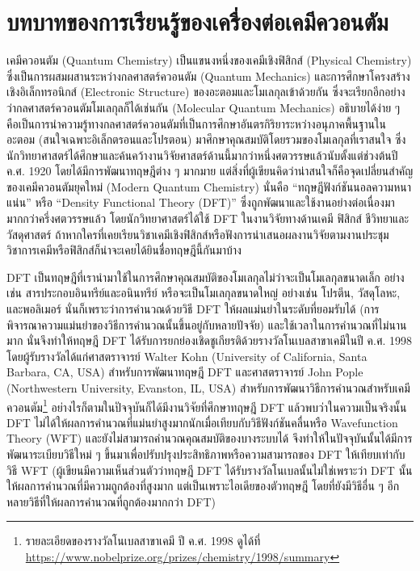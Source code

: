 \section{บทบาทของการเรียนรู้ของเครื่องต่อเคมีควอนตัม}
\label{sec:ml_in_qm}

เคมีควอนตัม (Quantum Chemistry) เป็นแขนงหนึ่งของเคมีเชิงฟิสิกส์ (Physical Chemistry) ซึ่งเป็นการผสมผสานระหว่างกลศาสตร์ควอนตัม (Quantum Mechanics) และการศึกษาโครงสร้างเชิงอิเล็กทรอนิกส์ (Electronic Structure) ของอะตอมและโมเลกุลเข้าด้วยกัน ซึ่งจะเรียกอีกอย่างว่ากลศาสตร์ควอนตัมโมเลกุลก็ได้เช่นกัน (Molecular Quantum Mechanics) อธิบายได้ง่าย ๆ คือเป็นการนำความรู้ทางกลศาสตร์ควอนตัมที่เป็นการศึกษาอันตรกิริยาระหว่างอนุภาคพื้นฐานในอะตอม (สนใจเฉพาะอิเล็กตรอนและโปรตอน) มาศึกษาคุณสมบัติโดยรวมของโมเลกุลที่เราสนใจ ซึ่งนักวิทยาศาสตร์ได้ศึกษาและค้นคว้างานวิจัยศาสตร์ด้านนี้มากว่าหนึ่งศตวรรษแล้วนับตั้งแต่ช่วงต้นปี ค.ศ. 1920 โดยได้มีการพัฒนาทฤษฎีต่าง ๆ มากมาย แต่สิ่งที่ผู้เขียนคิดว่าน่าสนใจก็คือจุดเปลี่ยนสำคัญของเคมีควอนตัมยุคใหม่ (Modern Quantum Chemistry) นั่นคือ \enquote{ทฤษฎีฟังก์ชันนอลความหนาแน่น} หรือ \enquote{Density Functional Theory (DFT)}\autocite{kohn1996} ซึ่งถูกพัฒนาและใช้งานอย่างต่อเนื่องมามากกว่าครึ่งศตวรรษแล้ว โดยนักวิทยาศาสตร์ได้ใช้ DFT ในงานวิจัยทางด้านเคมี ฟิสิกส์ ชีวิทยาและวัสดุศาสตร์ ถ้าหากใครที่เคยเรียนวิชาเคมีเชิงฟิสิกส์หรือฟังการนำเสนอผลงานวิจัยตามงานประชุมวิชาการเคมีหรือฟิสิกส์ก็น่าจะเคยได้ยินชื่อทฤษฎีนี้กันมาบ้าง 

DFT เป็นทฤษฎีที่เรานำมาใช้ในการศึกษาคุณสมบัติของโมเลกุลไม่ว่าจะเป็นโมเลกุลขนาดเล็ก อย่างเช่น สารประกอบอินทรีย์และอนินทรีย์ หรือจะเป็นโมเลกุลขนาดใหญ่ อย่างเช่น โปรตีน, วัสดุโลหะ, และพอลิเมอร์ นั่นก็เพราะว่าการคำนวณด้วยวิธี DFT ให้ผลแม่นยำในระดับที่ยอมรับได้ (การพิจารณาความแม่นยำของวิธีการคำนวณนั้นขึ้นอยู่กับหลายปัจจัย) และใช้เวลาในการคำนวณที่ไม่นานมาก นั่นจึงทำให้ทฤษฎี DFT ได้รับการยกย่องเชิดชูเกียรติด้วยรางวัลโนเบลสาขาเคมีในปี ค.ศ. 1998 โดยผู้รับรางวัลได้แก่ศาสตราจารย์ Walter Kohn (University of California, Santa Barbara, CA, USA) สำหรับการพัฒนาทฤษฎี DFT และศาสตราจารย์ John Pople (Northwestern University, Evanston, IL, USA) สำหรับการพัฒนาวิธีการคำนวณสำหรับเคมีควอนตัม\footnote{รายละเอียดของรางวัลโนเบลสาขาเคมี ปี ค.ศ. 1998 ดูได้ที่ \url{https://www.nobelprize.org/prizes/chemistry/1998/summary}} อย่างไรก็ตามในปัจจุบันก็ได้มีงานวิจัยที่ศึกษาทฤษฎี DFT แล้วพบว่าในความเป็นจริงนั้น DFT ไม่ได้ให้ผลการคำนวณที่แม่นยำสูงมากนักเมื่อเทียบกับวิธีฟังก์ชันคลื่นหรือ Wavefunction Theory (WFT)\autocite{korth2017,janesko2021} และยังไม่สามารถคำนวณคุณสมบัติของบางระบบได้ จึงทำให้ในปัจจุบันนั้นได้มีการพัฒนาระเบียบวิธีใหม่ ๆ ขึ้นมาเพื่อปรับปรุงประสิทธิภาพหรือความสามารถของ DFT ให้เทียบเท่ากับวิธี WFT (ผู้เขียนมีความเห็นส่วนตัวว่าทฤษฎี DFT ได้รับรางวัลโนเบลนั้นไม่ใช่เพราะว่า DFT นั้นให้ผลการคำนวณที่มีความถูกต้องที่สูงมาก แต่เป็นเพราะไอเดียของตัวทฤษฎี โดยที่ยังมีวิธีอื่น ๆ อีกหลายวิธีที่ให้ผลการคำนวณที่ถูกต้องมากกว่า DFT)


